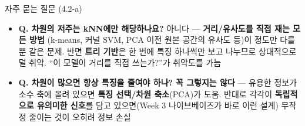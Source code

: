 \begin{frame}{자주 묻는 질문 (4.2-a)}
  \small
  \begin{itemize}
    \item \textbf{Q. 차원의 저주는 kNN에만 해당하나요?}
      아니다 --- \textbf{거리/유사도를 직접 재는 모든 방법}
      (k-means, 커널 SVM, PCA 이전 원본 공간의 유사도 등)이
      정도만 다를 뿐 같은 문제. 반면 \textbf{트리 기반}은
      한 번에 특징 하나씩만 보고 나누므로 상대적으로 덜 취약.
      ``이 모델이 거리를 직접 쓰는가?''가 취약도를 가늠
    \item \textbf{Q. 차원이 많으면 항상 특징을 줄여야 하나?}
      \textbf{꼭 그렇지는 않다} --- 유용한 정보가 소수 축에
      몰려 있으면 \textbf{특징 선택/차원 축소}(PCA)가 도움.
      반대로 각각이 \textbf{독립적으로 유의미한 신호}를 담고
      있으면(Week 3 나이브베이즈가 바로 이런 설계) 무작정
      줄이는 것이 오히려 정보 손실
  \end{itemize}
\end{frame}
